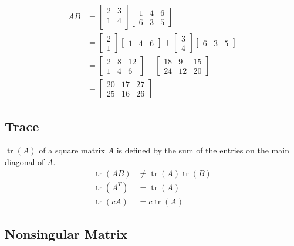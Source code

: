 \documentclass[12pt]{article}
\DeclareMathOperator{\tr}{tr}
\begin{document}
\begin{align*}
    AB &=
\left[ \begin{array}{c|c}
    2 & 3\\
    1 & 4\\
\end{array} \right]
\left[ \begin{array}{ccc}
    1 & 4 & 6\\
    \hline
    6 & 3 & 5
\end{array} \right]\\
    &=
    \begin{bmatrix}2\\1\end{bmatrix}
    \begin{bmatrix}1 & 4 & 6\end{bmatrix}
        +
    \begin{bmatrix}3\\4\end{bmatrix}
    \begin{bmatrix}6 & 3 & 5\end{bmatrix}
    \\
    &=
    \begin{bmatrix}2 & 8 & 12\\1 & 4 & 6\end{bmatrix}
        +
    \begin{bmatrix}18 & 9 & 15\\24 & 12 & 20\end{bmatrix}
    \\
    &=
    \begin{bmatrix}20&17&27\\25&16&26\end{bmatrix}
\end{align*}


\subsection{Trace}

$\tr(A)$ of a square matrix $A$ is defined by the sum of the entries on the main diagonal of $A$.\\
\begin{align*}
    \tr(AB) &\neq \tr(A)\tr(B)\\
    \tr(A^T) &= \tr(A)\\
    \tr(cA) &= c\tr(A)
\end{align*}


\subsection{Nonsingular Matrix}
\end{document}
